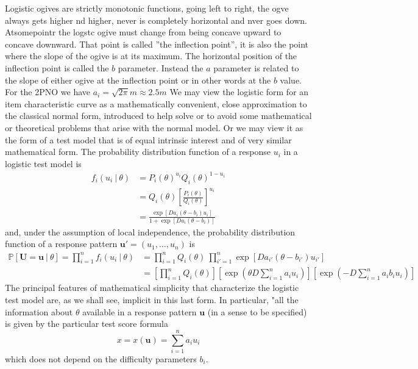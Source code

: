 Logistic ogives are strictly monotonic functions, going left to right, the ogve always gets higher nd higher, never is completely horizontal and nver goes down. Atsomepointr the logstc ogive must change from being concave upward to concave downward. That point is called ''the inflection point'', it is also the point where the slope of the ogive is at its maximum. The horizontal position of the inflection point is called the $b$ parameter.
Instead the $a$ parameter is related to the slope of either ogive at the inflection point or in other words at the $b$ value.
For the 2PNO we have $a_i=\sqrt{2\pi}m 	\approx2.5m$
We may view the logistic form for an item characteristic curve as a mathematically convenient, close approximation to the classical normal form, introduced to help solve or to avoid some mathematical or theoretical problems that arise with the normal model. Or we may view it as the form of a test model
that is of equal intrinsic interest and of very similar mathematical form.
The probability distribution function of a response $u_i$ in a logistic test model is
\begin{equation}
\begin{split}
f_i(u_i \ | \ \theta)&=P_i(\theta)^{u_i}Q_i(\theta)^{1-u_i}\\
	       &=Q_i(\theta)\left[ \frac{P_i(\theta)}{Q_i(\theta)} \right]^{u_i}\\
	       &=\frac{\exp[Da_i(\theta-b_i)u_i]}{1+\exp[Da_i(\theta-b_i)]}
\end{split}
\end{equation}
and, under the assumption of local independence, the probability distribution function of a response pattern $\boldsymbol{u}'=(u_1,\ldots,u_n)$ is
\begin{equation}
\begin{split}
\mathbb{P}[\boldsymbol{U}=\boldsymbol{u}\ | \ \theta]=\prod_{i=1}^n f_i(u_i \ | \ \theta)&=\prod_{i=1}^n{Q_i(\theta)} \ \prod_{i'=1}^n {\exp [Da_{i'}(\theta-b_{i'})u_{i'}]} \\
	   &=\left[ \prod_{i=1}^n{Q_i(\theta)} \right] \left[ \exp \left(\theta D \sum_{i=1}^n{a_i u_i} \right) \right]\left[ \exp \left( -D \sum_{i=1}^n{a_i b_i u_i} \right) \right]
\end{split}
\end{equation}
The principal features of mathematical simplicity that characterize the logistic test model are, as we shall see, implicit in this last form. In particular, "all the information about $\theta$ available in a response pattern $\boldsymbol{u}$ (in a sense to be specified) is given by the particular test score formula
\begin{equation}
x=x(\boldsymbol{u})=\sum_{i=1}^n a_i u_i
\end{equation}
which does not depend on the difficulty parameters $b_i$.
